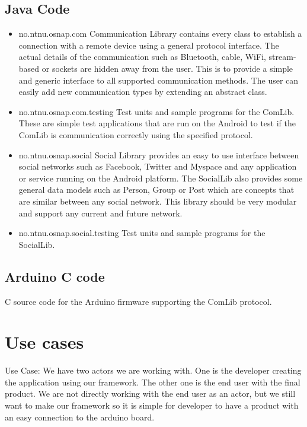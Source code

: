 \subsection{Java Code}
\begin{itemize}
\item{no.ntnu.osnap.com}\newline
Communication Library contains every class to establish a connection with a remote device using a general protocol interface. The actual details of the communication such as
Bluetooth, cable, WiFi, stream-based or sockets are hidden away from the user. This is to provide a simple and generic interface to all supported communication methods. The
user can easily add new communication types by extending an abstract class.
\item{no.ntnu.osnap.com.testing}\newline
Test units and sample programs for the ComLib. These are simple test applications that are run on the Android to test if the ComLib is communication correctly using the specified
protocol.
\item{no.ntnu.osnap.social}\newline
Social Library provides an easy to use interface between social networks such as Facebook, Twitter and Myspace and any application or service running on the Android platform.
The SocialLib also provides some general data models such as Person, Group or Post which are concepts that are similar between any social network. This library should be very modular
and support any current and future network.
\item{no.ntnu.osnap.social.testing}  \newline
Test units and sample programs for the SocialLib.
\end{itemize}

\subsection{Arduino C code}
C source code for the Arduino firmware supporting the ComLib protocol.

\newpage
\section{Use cases}
Use Case:
We have two actors we are working with. One is the developer creating the application using our framework. The other one is the end user with the final product. We are not directly working with the end user as an actor, but we still want to make our framework so it is simple for developer to have a product with an easy connection to the arduino board.

